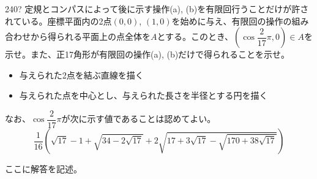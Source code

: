\begin{prob}{240}{\hosi ?}{}
 定規とコンパスによって後に示す操作(a), (b)を有限回行うことだけが許されている。座標平面内の2点$(0,0)$, $(1,0)$を始めに与え、有限回の操作の組み合わせから得られる平面上の点全体を$A$とする。このとき、$(\cos\dfrac{2}{17}\pi,0)\in A$を示せ。また、正17角形が有限回の操作(a), (b)だけで得られることを示せ。

 \begin{itemize}
  \setlength{\leftskip}{3eM}
  \item[操作(a)] 与えられた2点を結ぶ直線を描く
  \item[操作(b)] 与えられた点を中心とし、与えられた長さを半径とする円を描く
 \end{itemize}

 なお、$\cos\dfrac{2}{17}\pi$が次に示す値であることは認めてよい。
 \[ \!\!\frac{1}{16}\!\!\left(\sqrt{17}-1+\sqrt{34-2\sqrt{17}}+2\sqrt{17+3\sqrt{17}-\sqrt{170+38\sqrt{17}}}\right) \]
\end{prob}
ここに解答を記述。